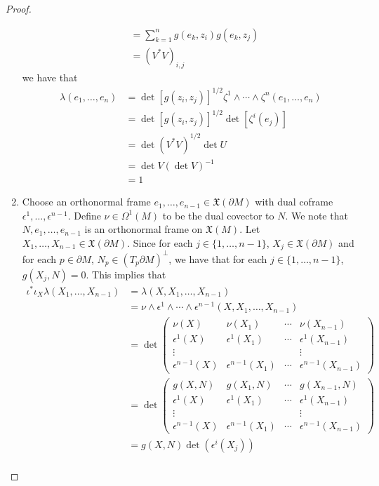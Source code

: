 \documentclass{book}
\theoremstyle{definition}
\newcommand{\ep}{\epsilon}
\newcommand{\ze}{\zeta}
\newcommand{\lam}{\lambda}
\newcommand{\Om}{\Omega}
\newcommand{\MFX}{\mathfrak{X}}
\DeclareMathOperator*{\0}{\mbf{0}}
\DeclareMathOperator*{\1}{\mbf{1}}
\newcommand{\p}{\partial}
\begin{document}
\begin{proof}
\begin{enumerate}
\begin{align*}
			& = \sum_{k=1}^n  g(e_k, z_i) g(e_k, z_j) \\
			& = (V^*V)_{i,j}
		\end{align*}
		we have that
		\begin{align*}
			\lam(e_1, \ldots, e_n)
			& = \det [g(z_i, z_j)]^{1/2} \ze^1 \wedge \cdots \wedge \ze^n(e_1, \ldots, e_n) \\
			& = \det [g(z_i, z_j)]^{1/2} \det [\ze^i(e_j)] \\
			& = \det (V^*V)^{1/2} \det U \\
			& = \det V (\det V)^{-1} \\
			& = 1
		\end{align*}
		\item Choose an orthonormal frame $e_1, \ldots, e_{n-1} \in \MFX(\p M)$ with dual coframe $\ep^1, \ldots, \ep^{n-1}$. Define $\nu \in \Om^1(M)$ to be the dual covector to $N$. We note that $N, e_1, \ldots, e_{n-1}$ is an orthonormal frame on $\MFX(M)$. Let $X_1, \ldots, X_{n-1} \in \MFX(\p M)$. Since for each $j \in \{1, \ldots, n-1\}$, $X_j \in \MFX(\p M)$ and for each $p \in \p M$, $N_p \in (T_p \p M)^{\perp}$, we have that for each $j \in \{1, \ldots, n-1\}$, $g(X_j, N) = 0$. This implies that 
		\begin{align*}
			\iota^* \iota_X \lam (X_1, \ldots, X_{n-1})
			& = \lam(X, X_1, \ldots, X_{n-1}) \\
			& = \nu \wedge \ep^1 \wedge \cdots \wedge \ep^{n-1} (X, X_1, \ldots, X_{n-1})  \\
			& = \det 
			\begin{pmatrix}
				\nu(X)     & \nu(X_1)     & \cdots & \nu(X_{n-1}) \\
				\ep^1(X) & \ep^1(X_1) & \cdots & \ep^1(X_{n-1}) \\ 
				\vdots   &            &        &  \vdots \\
				\ep^{n-1}(X) & \ep^{n-1}(X_1) & \cdots & \ep^{n-1}(X_{n-1})
			\end{pmatrix} \\
			& = \det 
			\begin{pmatrix}
				g(X, N)    & g(X_1, N)     & \cdots & g(X_{n-1}, N) \\
				\ep^1(X)   & \ep^1(X_1)    & \cdots & \ep^1(X_{n-1}) \\ 
				\vdots     &               &        &  \vdots \\
				\ep^{n-1}(X) & \ep^{n-1}(X_1) & \cdots & \ep^{n-1}(X_{n-1})
			\end{pmatrix} \\
			& = g(X, N) \det (\ep^i(X_j)) \\

\end{align*}
\end{enumerate}
\end{proof}
\end{document}
